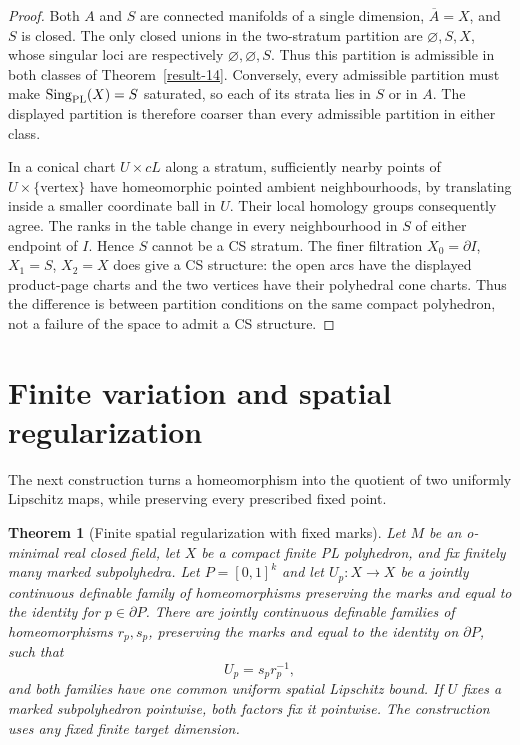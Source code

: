 \documentclass[11pt,a4paper]{article}
\newtheorem{theorem}{Theorem}[section]
\theoremstyle{definition}
\begin{document}
\begin{proof}
Both $A$ and $S$ are connected manifolds of a single dimension,
$\overline A=X$, and $S$ is closed.  The only closed unions in the
two-stratum partition are $\varnothing,S,X$, whose singular loci
are respectively $\varnothing,\varnothing,S$.
Thus this partition is admissible in both classes of
Theorem~\ref{result-14}.  Conversely, every admissible partition
must make $\operatorname{Sing}_{\rm PL}(X)=S$ saturated, so each
of its strata lies in $S$ or in $A$.  The displayed partition is
therefore coarser than every admissible partition in either class.

In a conical chart $U\times cL$ along a stratum, sufficiently
nearby points of $U\times\{\text{vertex}\}$ have homeomorphic
pointed ambient neighbourhoods, by translating inside a smaller
coordinate ball in $U$.  Their local homology groups consequently
agree.  The ranks in the table change in every neighbourhood in
$S$ of either endpoint of $I$.  Hence $S$ cannot be a CS stratum.
The finer filtration
$X_0=\partial I$, $X_1=S$, $X_2=X$ does give a CS structure:
the open arcs have the displayed product-page charts and the
two vertices have their polyhedral cone charts.  Thus the
difference is between partition conditions on the same compact
polyhedron, not a failure of the space to admit a CS structure.
\end{proof}





\section{Finite variation and spatial regularization}
The next construction turns a homeomorphism into the quotient of two uniformly Lipschitz maps, while preserving every prescribed fixed point.

\begin{theorem}[Finite spatial regularization with fixed marks]\label{result-15}
Let $M$ be an o-minimal real closed field, let $X$ be a compact
finite PL polyhedron, and fix finitely many marked subpolyhedra.
Let $P=[0,1]^k$ and let $U_p:X\to X$ be a jointly continuous
definable family of homeomorphisms preserving the marks and
equal to the identity for $p\in\partial P$. There are jointly
continuous definable families of homeomorphisms $r_p,s_p$,
preserving the marks and equal to the identity on $\partial P$,
such that
\begin{equation}
 U_p=s_pr_p^{-1},
 \label{equation-1}
\end{equation}
and both families have one common uniform spatial Lipschitz
bound. If $U$ fixes a marked subpolyhedron pointwise, both factors
fix it pointwise. The construction uses any fixed finite
target dimension.

\end{theorem}
\end{document}
